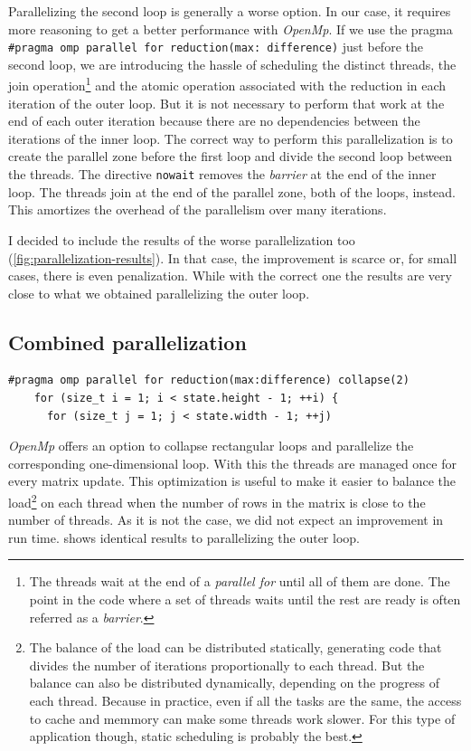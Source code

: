 \documentclass[
    12pt, %
]{fphw}
\newcommand{\tech}{\texttt}
\newcommand{\OpenMp}{\textit{OpenMp}}
\begin{document}
    Parallelizing the second loop is generally a worse option.
In our case, it requires more reasoning to get a better performance with \OpenMp{}.
If we use the pragma \tech{\#pragma omp parallel for reduction(max: difference)}
just before the second loop,
we are introducing the hassle of scheduling the distinct threads,
the join operation\footnote{
    The threads wait at the end of a \textit{parallel for} until all of them are done.
    The point in the code where a set of threads waits until the rest are ready
    is often referred as a \textit{barrier}.
} and the atomic operation associated with the reduction
in each iteration of the outer loop.
But it is not necessary to perform that work at the end of each outer iteration
because there are no dependencies between the iterations of the inner loop.
The correct way to perform this parallelization is to
create the parallel zone before the first loop and
divide the second loop between the threads.
The directive \tech{nowait} removes the \textit{barrier} at the end of the inner loop.
The threads join at the end of the parallel zone, both of the loops, instead.
This amortizes the overhead of the parallelism over many iterations.

    I decided to include the results of the worse parallelization too
(\cref{fig:parallelization-results}).
In that case, the improvement is scarce or, for small cases, there is even penalization.
While with the correct one the results are very close to what we obtained
parallelizing the outer loop.

\subsection{Combined parallelization}

\begin{lstlisting}[gobble=4]
    #pragma omp parallel for reduction(max:difference) collapse(2)
    for (size_t i = 1; i < state.height - 1; ++i) {
      for (size_t j = 1; j < state.width - 1; ++j)
\end{lstlisting}

    \OpenMp{} offers an option to collapse rectangular loops and parallelize the corresponding
one-dimensional loop.
With this the threads are managed once for every matrix update.
This optimization is useful to make it easier to balance the load\footnote{
    The balance of the load can be distributed statically,
    generating code that divides the number of iterations proportionally to each thread.
    But the balance can also be distributed dynamically, depending on the progress of each thread.
    Because in practice, even if all the tasks are the same,
    the access to cache and memmory can make some threads work slower.
    For this type of application though, static scheduling is probably the best.
} on each thread when the number of rows in the matrix is close to the number of threads.
As it is not the case, we did not expect an improvement in run time.
 shows identical results to parallelizing the outer loop.
\end{document}
